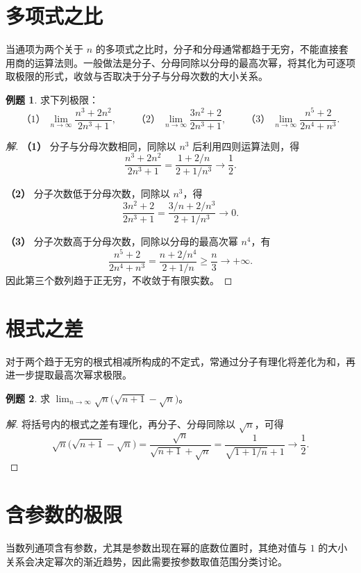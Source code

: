 \documentclass[UTF8, fontset=fandol, a4paper, 12pt]{ctexart}
\theoremstyle{definition}
\newtheorem{example}{例题}
\begin{document}
\section{多项式之比}
当通项为两个关于 $n$ 的多项式之比时，分子和分母通常都趋于无穷，不能直接套用商的运算法则。一般做法是分子、分母同除以分母的最高次幂，将其化为可逐项取极限的形式，收敛与否取决于分子与分母次数的大小关系。

\begin{example}
求下列极限：
\[
 \text{（1）}\ \lim_{n\to\infty}\frac{n^3+2n^2}{2n^3+1},\qquad
 \text{（2）}\ \lim_{n\to\infty}\frac{3n^2+2}{2n^3+1},\qquad
 \text{（3）}\ \lim_{n\to\infty}\frac{n^5+2}{2n^4+n^3}.
\]
\end{example}
\begin{proof}[解]
\textbf{（1）} 分子与分母次数相同，同除以 $n^3$ 后利用四则运算法则，得
\[
 \frac{n^3+2n^2}{2n^3+1}
 =\frac{1+2/n}{2+1/n^3}\longrightarrow\frac12.
\]

\textbf{（2）} 分子次数低于分母次数，同除以 $n^3$，得
\[
 \frac{3n^2+2}{2n^3+1}
 =\frac{3/n+2/n^3}{2+1/n^3}\longrightarrow0.
\]

\textbf{（3）} 分子次数高于分母次数，同除以分母的最高次幂 $n^4$，有
\[
 \frac{n^5+2}{2n^4+n^3}
 =\frac{n+2/n^4}{2+1/n}\ge\frac n3\longrightarrow+\infty.
\]
因此第三个数列趋于正无穷，不收敛于有限实数。
\end{proof}

\section{根式之差}
对于两个趋于无穷的根式相减所构成的不定式，常通过分子有理化将差化为和，再进一步提取最高次幂求极限。

\begin{example}
求 $\displaystyle\lim_{n\to\infty}\sqrt n\bigl(\sqrt{n+1}-\sqrt n\bigr)$。
\end{example}
\begin{proof}[解]
将括号内的根式之差有理化，再分子、分母同除以 $\sqrt n$，可得
\[
 \sqrt n\bigl(\sqrt{n+1}-\sqrt n\bigr)
 =\frac{\sqrt n}{\sqrt{n+1}+\sqrt n}
 =\frac1{\sqrt{1+1/n}+1}\longrightarrow\frac12.
\]
\end{proof}

\section{含参数的极限}
当数列通项含有参数，尤其是参数出现在幂的底数位置时，其绝对值与 $1$ 的大小关系会决定幂次的渐近趋势，因此需要按参数取值范围分类讨论。
\end{document}
